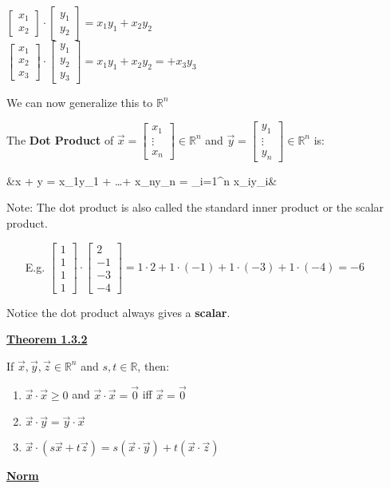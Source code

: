 \documentclass{letter}
\newcommand{\0}[1]{\begin{bmatrix}#1\end{bmatrix}}
\newcommand{\h}[1]{\underline{\textbf{#1}}}
\begin{document}
		$\0{x_1\\x_2} \cdot \0{y_1\\y_2} = x_1y_1 + x_2y_2$\\
		
		$\0{x_1\\x_2\\x_3} \cdot \0{y_1\\y_2\\y_3} = x_1y_1 + x_2y_2 =+ x_3y_3$
		
		We can now generalize this to $\mathbb{R}^n$
		
		The \textbf{Dot Product} of $\vec x = \0{x_1\\\vdots\\x_n} \in \mathbb{R}^n$ and $\vec y = \0{y_1\\\vdots\\y_n} \in \mathbb{R}^n$ is:
		\begin{flalign*}
		&\vec x + \vec y = x_1y_1 + \dots + x_ny_n = \sum_{i=1}^n x_iy_i&
		\end{flalign*}
		
		Note: The dot product is also called the standard inner product or the scalar product.
		
		\begin{itemize}
			\item[E.g. ] $\0{1\\1\\1\\1} \cdot \0{2\\-1\\-3\\-4} = 1\cdot 2 + 1\cdot(-1) + 1 \cdot (-3) + 1 \cdot (-4) = -6$
		\end{itemize}
	
	Notice the dot product always gives a \textbf{scalar}.
	
	\h{Theorem 1.3.2}
	
	If $\vec x, \vec y, \vec z \in \mathbb{R}^n$ and $s, t \in \mathbb{R}$, then:
	\begin{enumerate}[1)]
		\item $\vec x \cdot \vec x \geq 0$ and $\vec x \cdot \vec x = \vec 0$ iff $\vec x = \vec 0$
		\item $\vec x \cdot \vec y = \vec y \cdot \vec x$
		\item $\vec x \cdot (s \vec x + t \vec z) = s(\vec x \cdot \vec y) + t(\vec x \cdot \vec z)$
	\end{enumerate}
	
	\h{Norm}
	
\end{document}
